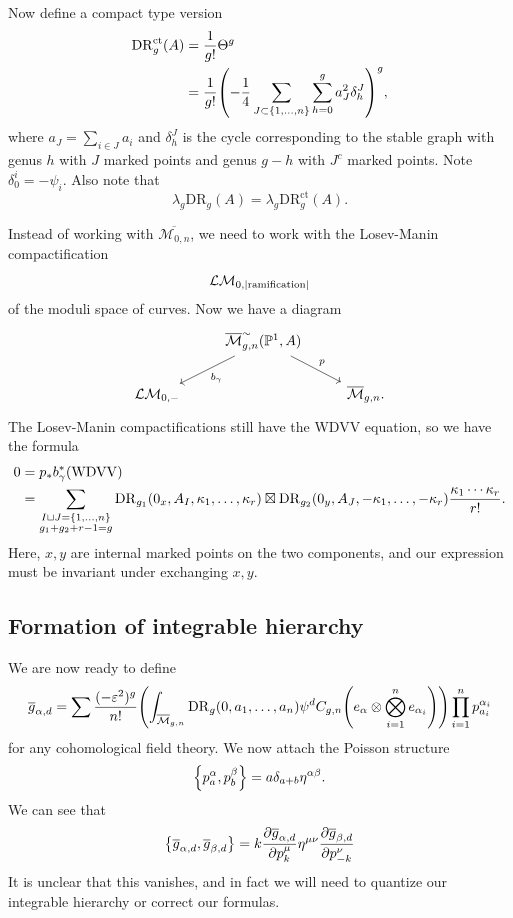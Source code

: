 \documentclass[leqno, openany]{memoir}
\theoremstyle{definition}
\theoremstyle{remark}
\theoremstyle{plain}
\theoremstyle{definition}
\theoremstyle{remark}
\renewcommand{\P}{\mathbb{P}}
\newcommand{\ep}{\varepsilon}
\newcommand{\mc}[1]{\mathcal{#1}}
\newcommand{\mr}[1]{\mathrm{#1}}
\newcommand{\ol}[1]{\overline{#1}}
\begin{document}
Now define a compact type version
\begin{align*} 
    \mr{DR}_g^{\mr{ct}}(A) &= \frac{1}{g!} \Theta^g \\
    &= \frac{1}{g!} \qty(-\frac{1}{4} \sum_{J \subset \qty{1, \ldots, n}} \sum_{h=0}^g a_J^2 \delta_h^J)^g,
\end{align*}
where $a_J = \sum_{i \in J} a_i$ and $\delta_h^J$ is the cycle corresponding to the stable graph with genus $h$ with $J$ marked points and genus $g-h$ with $J^c$ marked points. Note $\delta_0^{\qty{i}} = - \psi_i$. Also note that
\[ \lambda_g \mr{DR}_g(A) = \lambda_g \mr{DR}_g^{\mr{ct}}(A). \]

Instead of working with $\ol{\mc{M}_{0, n}}$, we need to work with the Losev-Manin compactification
\[ \mc{LM}_{0, \abs{\text{ramification}}} \]
of the moduli space of curves. Now we have a diagram
\begin{equation*}
\begin{tikzcd}
    & \ol{\mc{M}}_{g, n}^{\sim}(\P^1, A) \ar{dl}{b_{\gamma}} \ar{dr}{p} \\
    \mc{LM}_{0,-} & & \ol{\mc{M}}_{g, n}.
\end{tikzcd}
\end{equation*}
The Losev-Manin compactifications still have the WDVV equation, so we have the formula
\begin{align*}
    0 &= p_* b_{\gamma}^* (\mr{WDVV}) \\
    &= \sum_{\substack{I \sqcup J = \qty{1, \ldots,n} \\ g_1+g_2+r-1=g}} \mr{DR}_{g_1}(0_x, A_I, \kappa_1, \ldots, \kappa_r) \boxtimes \mr{DR}_{g_2}(0_y, A_J, -\kappa_1, \ldots, -\kappa_r)\frac{\kappa_1 \cdots \kappa_r}{r!}.
\end{align*}
Here, $x, y$ are internal marked points on the two components, and our expression must be invariant under exchanging $x, y$.

\subsection{Formation of integrable hierarchy}

We are now ready to define
\[ \ol{g}_{\alpha, d} = \sum \frac{(-\ep^2)^g}{n!} \qty(\int_{\ol{\mc{M}}_{g, n}} \mr{DR}_g(0, a_1, \ldots, a_n) \psi^d C_{g, n}\qty(e_{\alpha} \otimes \bigotimes_{i=1}^n e_{\alpha_i})) \prod_{i=1}^n p_{a_i}^{\alpha_i} \]
for any cohomological field theory. We now attach the Poisson structure
\[ \qty{p_a^{\alpha}, p_b^{\beta}} = a \delta_{a+b} \eta^{\alpha\beta}. \]
We can see that
\[ \qty{\ol{g}_{\alpha, d}, \ol{g}_{\beta, d}} = k \pdv{\ol{g}_{\alpha, d}}{p_k^{\mu}} \eta^{\mu\nu} \pdv{\ol{g}_{\beta,d}}{p_{-k}^{\nu}} \]
It is unclear that this vanishes, and in fact we will need to quantize our integrable hierarchy or correct our formulas. 
\end{document}

